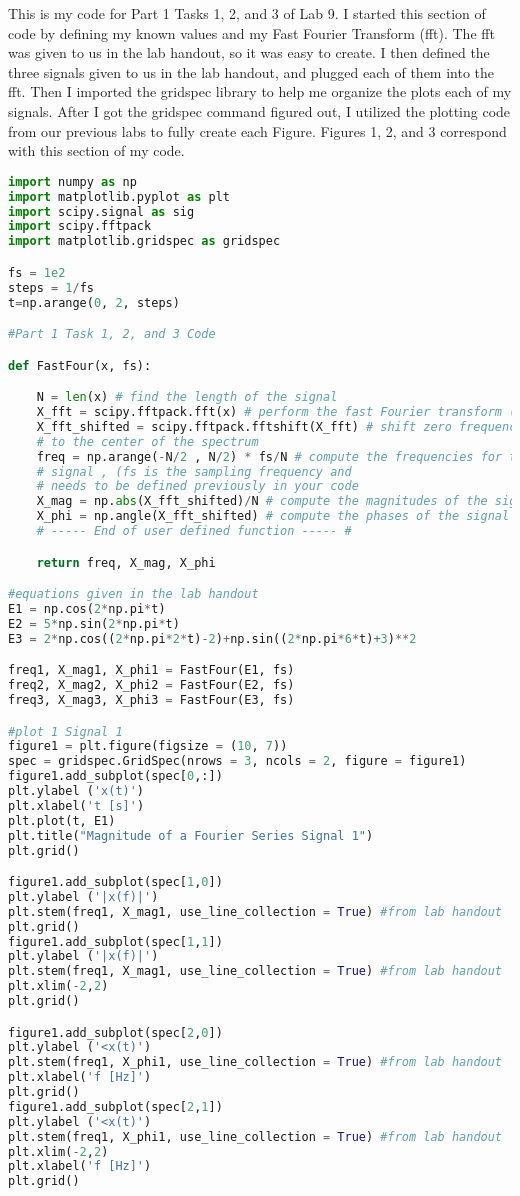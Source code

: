 \documentclass[12pt]{report}
\begin{document}
This is my code for Part 1 Tasks 1, 2, and 3 of Lab 9. I started this section of code by defining my known values and my Fast Fourier Transform (fft). The fft was given to us in the lab handout, so it was easy to create. I then defined the three signals given to us in the lab handout, and plugged each of them into the fft. Then I imported the gridspec library to help me organize the plots each of my signals. After I got the gridspec command figured out, I utilized the plotting code from our previous labs to fully create each Figure. Figures 1, 2, and 3 correspond with this section of my code. 
\begin{lstlisting}[language=Python]
import numpy as np
import matplotlib.pyplot as plt
import scipy.signal as sig
import scipy.fftpack
import matplotlib.gridspec as gridspec

fs = 1e2
steps = 1/fs
t=np.arange(0, 2, steps)

#Part 1 Task 1, 2, and 3 Code

def FastFour(x, fs):

    N = len(x) # find the length of the signal
    X_fft = scipy.fftpack.fft(x) # perform the fast Fourier transform (fft)
    X_fft_shifted = scipy.fftpack.fftshift(X_fft) # shift zero frequency components
    # to the center of the spectrum
    freq = np.arange(-N/2 , N/2) * fs/N # compute the frequencies for the output
    # signal , (fs is the sampling frequency and
    # needs to be defined previously in your code
    X_mag = np.abs(X_fft_shifted)/N # compute the magnitudes of the signal
    X_phi = np.angle(X_fft_shifted) # compute the phases of the signal
    # ----- End of user defined function ----- #

    return freq, X_mag, X_phi

#equations given in the lab handout
E1 = np.cos(2*np.pi*t)
E2 = 5*np.sin(2*np.pi*t)
E3 = 2*np.cos((2*np.pi*2*t)-2)+np.sin((2*np.pi*6*t)+3)**2

freq1, X_mag1, X_phi1 = FastFour(E1, fs)
freq2, X_mag2, X_phi2 = FastFour(E2, fs)
freq3, X_mag3, X_phi3 = FastFour(E3, fs)

#plot 1 Signal 1
figure1 = plt.figure(figsize = (10, 7))
spec = gridspec.GridSpec(nrows = 3, ncols = 2, figure = figure1)
figure1.add_subplot(spec[0,:])
plt.ylabel ('x(t)')
plt.xlabel('t [s]')
plt.plot(t, E1)
plt.title("Magnitude of a Fourier Series Signal 1")
plt.grid()

figure1.add_subplot(spec[1,0])
plt.ylabel ('|x(f)|')
plt.stem(freq1, X_mag1, use_line_collection = True) #from lab handout
plt.grid()
figure1.add_subplot(spec[1,1])
plt.ylabel ('|x(f)|')
plt.stem(freq1, X_mag1, use_line_collection = True) #from lab handout
plt.xlim(-2,2)
plt.grid()

figure1.add_subplot(spec[2,0])
plt.ylabel ('<x(t)')
plt.stem(freq1, X_phi1, use_line_collection = True) #from lab handout
plt.xlabel('f [Hz]')
plt.grid()
figure1.add_subplot(spec[2,1])
plt.ylabel ('<x(t)')
plt.stem(freq1, X_phi1, use_line_collection = True) #from lab handout
plt.xlim(-2,2)
plt.xlabel('f [Hz]')
plt.grid()

\end{lstlisting}
\end{document}
